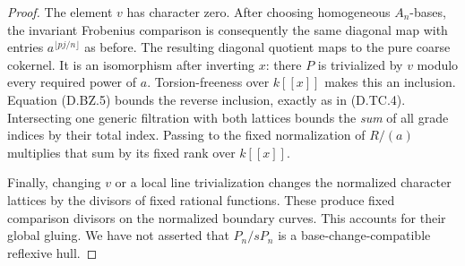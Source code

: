 \begin{proof}
The element $v$ has character zero.  After choosing homogeneous
$A_n$-bases, the invariant Frobenius comparison is consequently
the same diagonal map with entries $a^{\lfloor pj/n\rfloor}$
as before.  The resulting diagonal quotient maps to the pure
coarse cokernel.  It is an isomorphism after inverting $x$:
there $P$ is trivialized by $v$ modulo every required power of
$a$.  Torsion-freeness over $k[[x]]$ makes this an inclusion.
Equation (D.BZ.5) bounds the reverse inclusion, exactly as in
(D.TC.4).  Intersecting one generic filtration with both
lattices bounds the \emph{sum} of all grade indices by their
total index.  Passing to the fixed normalization of $R/(a)$
multiplies that sum by its fixed rank over $k[[x]]$.

Finally, changing $v$ or a local line trivialization changes
the normalized character lattices by the divisors of fixed
rational functions.  These produce fixed comparison divisors
on the normalized boundary curves.  This accounts for their
global gluing.  We have not asserted that $P_n/sP_n$ is a
base-change-compatible reflexive hull.
\end{proof}

